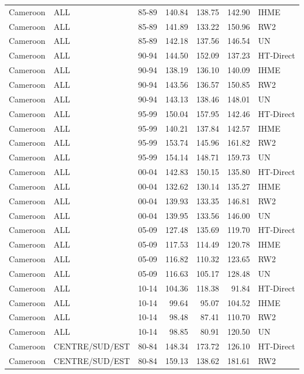 \begin{longtable}{lllrrrl}
  Cameroon & ALL & 85-89 & 140.84 & 138.75 & 142.90 & IHME \\ 
  Cameroon & ALL & 85-89 & 141.89 & 133.22 & 150.96 & RW2 \\ 
  Cameroon & ALL & 85-89 & 142.18 & 137.56 & 146.54 & UN \\ 
  Cameroon & ALL & 90-94 & 144.50 & 152.09 & 137.23 & HT-Direct \\ 
  Cameroon & ALL & 90-94 & 138.19 & 136.10 & 140.09 & IHME \\ 
  Cameroon & ALL & 90-94 & 143.56 & 136.57 & 150.85 & RW2 \\ 
  Cameroon & ALL & 90-94 & 143.13 & 138.46 & 148.01 & UN \\ 
  Cameroon & ALL & 95-99 & 150.04 & 157.95 & 142.46 & HT-Direct \\ 
  Cameroon & ALL & 95-99 & 140.21 & 137.84 & 142.57 & IHME \\ 
  Cameroon & ALL & 95-99 & 153.74 & 145.96 & 161.82 & RW2 \\ 
  Cameroon & ALL & 95-99 & 154.14 & 148.71 & 159.73 & UN \\ 
  Cameroon & ALL & 00-04 & 142.83 & 150.15 & 135.80 & HT-Direct \\ 
  Cameroon & ALL & 00-04 & 132.62 & 130.14 & 135.27 & IHME \\ 
  Cameroon & ALL & 00-04 & 139.93 & 133.35 & 146.81 & RW2 \\ 
  Cameroon & ALL & 00-04 & 139.95 & 133.56 & 146.00 & UN \\ 
  Cameroon & ALL & 05-09 & 127.48 & 135.69 & 119.70 & HT-Direct \\ 
  Cameroon & ALL & 05-09 & 117.53 & 114.49 & 120.78 & IHME \\ 
  Cameroon & ALL & 05-09 & 116.82 & 110.32 & 123.65 & RW2 \\ 
  Cameroon & ALL & 05-09 & 116.63 & 105.17 & 128.48 & UN \\ 
  Cameroon & ALL & 10-14 & 104.36 & 118.38 & 91.84 & HT-Direct \\ 
  Cameroon & ALL & 10-14 & 99.64 & 95.07 & 104.52 & IHME \\ 
  Cameroon & ALL & 10-14 & 98.48 & 87.41 & 110.70 & RW2 \\ 
  Cameroon & ALL & 10-14 & 98.85 & 80.91 & 120.50 & UN \\ 
  Cameroon & CENTRE/SUD/EST & 80-84 & 148.34 & 173.72 & 126.10 & HT-Direct \\ 
  Cameroon & CENTRE/SUD/EST & 80-84 & 159.13 & 138.62 & 181.61 & RW2 \\ 

\end{longtable}
